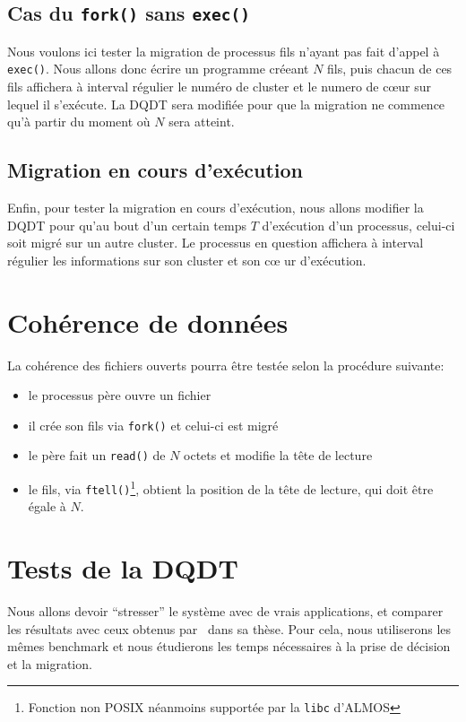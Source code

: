     \subsection{Cas du \texttt{fork()} sans \texttt{exec()}}

      Nous voulons ici tester la migration de processus fils n'ayant pas fait
      d'appel à \texttt{exec()}. Nous allons donc écrire un programme créeant
      $N$ fils, puis chacun de ces fils affichera à interval régulier le numéro
      de cluster et le numero de c\oe ur sur lequel il s'exécute. La DQDT sera
      modifiée pour que la migration ne commence qu'à partir du moment où $N$
      sera atteint.

    \subsection{Migration en cours d'exécution}

      Enfin, pour tester la migration en cours d'exécution, nous allons modifier
      la DQDT pour qu'au bout d'un certain temps $T$ d'exécution d'un processus,
      celui-ci soit migré sur un autre cluster. Le processus en question
      affichera à interval régulier les informations sur son cluster et son c\oe
      ur d'exécution.


  \section{Cohérence de données}

    La cohérence des fichiers ouverts pourra être testée selon la procédure
    suivante:
    \begin{itemize}
      \item le processus père ouvre un fichier
      \item il crée son fils via \texttt{fork()} et celui-ci est migré
      \item le père fait un \texttt{read()} de $N$ octets et modifie la tête de
        lecture
      \item le fils, via \texttt{ftell()}\footnote{Fonction non POSIX néanmoins
        supportée par la \texttt{libc} d'ALMOS}, obtient la position de la tête
        de lecture, qui doit être égale à $N$.
    \end{itemize}


  \section{Tests de la DQDT}
  \label{sec:dqdt-test}

    Nous allons devoir ``stresser'' le système avec de vrais applications, et
    comparer les résultats avec ceux obtenus
    par~\citeauthor{almaless2014universite} dans sa thèse. Pour cela, nous
    utiliserons les mêmes benchmark et nous étudierons les temps nécessaires à
    la prise de décision et la migration.
